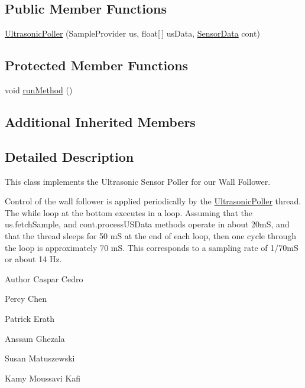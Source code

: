 \subsection*{Public Member Functions}
\begin{DoxyCompactItemize}
\item 
\hyperlink{classca_1_1mcgill_1_1ecse211_1_1threads_1_1_ultrasonic_poller_ac561f5d04e2b655a4509de8453c0cd07}{Ultrasonic\+Poller} (Sample\+Provider us, float\mbox{[}$\,$\mbox{]} us\+Data, \hyperlink{classca_1_1mcgill_1_1ecse211_1_1threads_1_1_sensor_data}{Sensor\+Data} cont)
\end{DoxyCompactItemize}
\subsection*{Protected Member Functions}
\begin{DoxyCompactItemize}
\item 
void \hyperlink{classca_1_1mcgill_1_1ecse211_1_1threads_1_1_ultrasonic_poller_a8e6a84342aedc1b72741dbc2e80148c4}{run\+Method} ()
\end{DoxyCompactItemize}
\subsection*{Additional Inherited Members}


\subsection{Detailed Description}
This class implements the Ultrasonic Sensor Poller for our Wall Follower.

Control of the wall follower is applied periodically by the \hyperlink{classca_1_1mcgill_1_1ecse211_1_1threads_1_1_ultrasonic_poller}{Ultrasonic\+Poller} thread. The while loop at the bottom executes in a loop. Assuming that the us.\+fetch\+Sample, and cont.\+process\+U\+S\+Data methods operate in about 20mS, and that the thread sleeps for 50 mS at the end of each loop, then one cycle through the loop is approximately 70 mS. This corresponds to a sampling rate of 1/70mS or about 14 Hz.

\begin{DoxyAuthor}{Author}
Caspar Cedro 

Percy Chen 

Patrick Erath 

Anssam Ghezala 

Susan Matuszewski 

Kamy Moussavi Kafi 
\end{DoxyAuthor}


